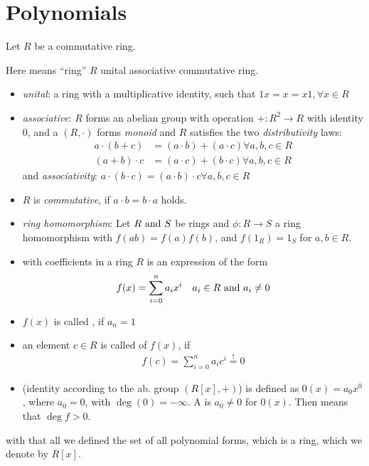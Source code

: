 \section{Polynomials}
Let $R$ be a commutative ring.
\begin{*remark}
Here means ``ring'' $R$ unital associative commutative ring.
	\begin{itemize}
		\item \emph{unital}: a ring with a multiplicative identity, such that $1x = x = x1, \forall x \in R$
		\item \emph{associative}: $R$ forms an abelian group with operation $+\colon R^2 \to R$ with identity 0, and a $(R,\cdot)$ forms \emph{monoid} and $R$ satisfies the two \emph{distributivity} laws:
		\begin{align*}
			a\cdot (b+c) &= (a\cdot b)+(a\cdot c)\forall a,b,c \in R\\
			(a + b)\cdot c &= (a\cdot c)+(b\cdot c)\forall a,b,c \in R
		\end{align*}
		and \emph{associativity}: $a\cdot (b\cdot c) = (a\cdot b)\cdot c\forall a,b,c \in R$
		\item $R$ is \emph{commutative}, if $a\cdot b = b \cdot a$ holds.
		\item \emph{ring homomorphism}: Let $R \text{ and } S$ be rings and $\phi\colon R \to S$ a ring homomorphism with $f(ab) = f(a)f(b)$, and $f(1_R) = 1_S$ for $a,b \in R$.
	\end{itemize}
\end{*remark}
\begin{definition}
	\begin{itemize}
		\item {} with coefficients in a ring $R$ is an expression of the form
		\begin{align*}
		f(x) = \sum_{i=0}^n a_i x^i\quad a_i \in R\text{ and } a_i \neq 0
		\end{align*}
		\item $f(x)$ is called , if $a_n = 1$
		\item an element $c \in R$ is called  of $f(x)$, if
		\begin{align*}
			f(c) = \sum_{i=0}^n a_i c^i \overset{\text{!}}{=} 0
		\end{align*}
		\item {} (identity according to the ab. group $(R[x],+)$) is defined as $0(x) = a_0 x^0$, where $a_0 = 0$, with $\deg(0) = -\infty$. A  is $a_0 \neq 0$ for $0(x)$. Then  means that $\deg f > 0$. 
	\end{itemize}
	with that all we defined the set of all polynomial forms, which is a ring, which we denote by $R[x]$.
\end{definition}
